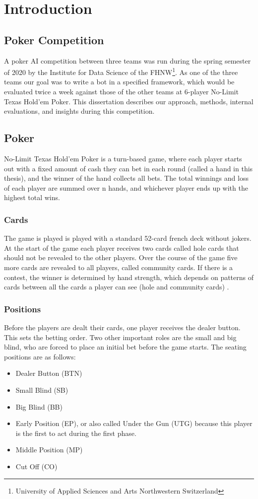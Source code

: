\chapter{Introduction}
\section{Poker Competition}
A poker AI competition between three teams was run during the spring semester of 2020 by the Institute for Data Science of the FHNW\footnote{University of Applied Sciences and Arts Northwestern Switzerland}. As one of the three teams our goal was to write a bot in a specified framework, which would be evaluated twice a week against those of the other teams at 6-player No-Limit Texas Hold'em Poker. This dissertation describes our approach, methods, internal evaluations, and insights during this competition.

\section{Poker}
No-Limit Texas Hold'em Poker is a turn-based game, where each player starts out with a fixed amount of cash they can bet in each round (called a hand in this thesis), and the winner of the hand collects all bets. The total winnings and loss of each player are summed over n hands, and whichever player ends up with the highest total wins.

\subsection{Cards}
The game is played is played with a standard 52-card french deck without jokers. At the start of the game each player receives two cards called hole cards that should not be revealed to the other players. Over the course of the game five more cards are revealed to all players, called community cards. If there is a contest, the winner is determined by hand strength, which depends on patterns of cards between all the cards a player can see (hole and community cards) \cite{HoldemHandvalues}.

\subsection{Positions}
Before the players are dealt their cards, one player receives the dealer button. This sets the betting order. Two other important roles are the small and big blind, who are forced to place an initial bet before the game starts. The seating positions are as follows:
\begin{itemize}
    \item Dealer Button (BTN)
    \item Small Blind (SB)
    \item Big Blind (BB)
    \item Early Position (EP), or also called Under the Gun (UTG) because this player is the first to act during the first phase.
    \item Middle Position (MP)
    \item Cut Off (CO)
\end{itemize}

